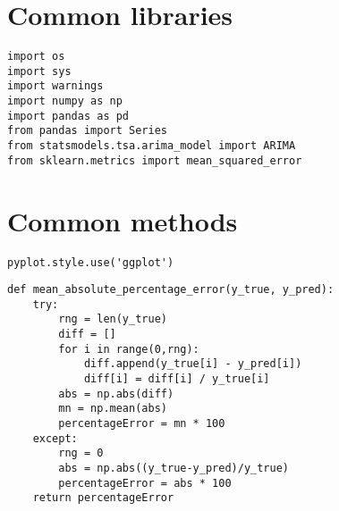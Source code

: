 \section{Common libraries}
\label{Pred_common_libraries}
\begin{lstlisting}
import os
import sys
import warnings
import numpy as np
import pandas as pd
from pandas import Series
from statsmodels.tsa.arima_model import ARIMA
from sklearn.metrics import mean_squared_error
\end{lstlisting}

\newpage

\section{Common methods}
\label{Pred_common_methods}
\begin{lstlisting}
pyplot.style.use('ggplot')
\end{lstlisting}

\begin{lstlisting}
def mean_absolute_percentage_error(y_true, y_pred): 
	try:
		rng = len(y_true)
		diff = []
		for i in range(0,rng):
			diff.append(y_true[i] - y_pred[i])
			diff[i] = diff[i] / y_true[i]
		abs = np.abs(diff)
		mn = np.mean(abs)
		percentageError = mn * 100
	except:
		rng = 0
		abs = np.abs((y_true-y_pred)/y_true)
		percentageError = abs * 100
	return percentageError
\end{lstlisting}

\newpage

